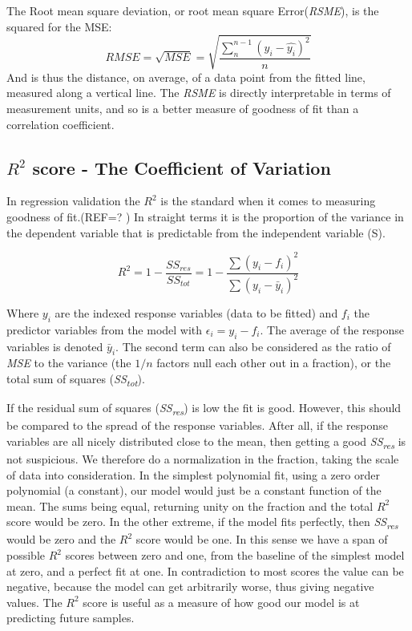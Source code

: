 The Root mean square deviation, or root mean square Error(\textit{RSME}), is the squared for the MSE:
$$RMSE = \sqrt{MSE} =  \sqrt{\frac{\sum^{n-1}_{n}(y_{i}-\hat{y_{i}})^2 }{n}} $$
And is thus the distance, on average, of a data point from the fitted line, measured along a vertical line. The \textit{RSME} is directly interpretable in terms of measurement units, and so is a better measure of goodness of fit than a correlation coefficient. 

\subsection{$R^2$ score - The Coefficient of Variation}

	In regression validation the $R^2$ is the standard when it comes to measuring goodness of fit.(REF=?\cite{coef} ) In straight terms it is the proportion of the variance in the dependent variable that is predictable from the independent variable (S).

\begin{equation}\label{eq: R squared}
	R^2 =1 - \frac{SS_{res}}{SS_{tot}} =  1 - \frac{ \sum(y_i-f_i)^2 }{ \sum(y_i-\bar{y}_i)^2 }
\end{equation}

	Where $y_i$ are the indexed response variables (data  to be fitted) and $f_i$ the predictor variables from the model with $\epsilon_i = y_i - f_i$. The average of the response variables is denoted $\bar{y}_i$. The second term can also be considered as the ratio of \textit{MSE} to the variance (the $1/n$ factors null each other out in a fraction), or the total sum of squares (\textit{SS\textsubscript{tot}}). 
	
	If the residual sum of squares (\textit{SS\textsubscript{res}}) is low the fit is good. However, this should be compared to the spread of the response variables. After all, if the response variables are all nicely distributed close to the mean, then getting a good \textit{SS\textsubscript{res}} is not suspicious. We therefore do a normalization in the fraction, taking the scale of data into consideration. In the simplest polynomial fit, using a zero order polynomial (a constant), our model would just be a constant function of the mean. The sums being equal, returning unity on the fraction and the total $R^2$ score would be zero. In the other extreme, if the model fits perfectly, then \textit{SS\textsubscript{res}} would be zero and the $R^2$ score would be one. In this sense we have a span of possible $R^2$ scores between zero and one, from the baseline of the simplest model at zero, and a perfect fit at one. In contradiction to most scores the value can be negative, because the model can get arbitrarily worse, thus giving negative values.
	The $R^2$ score is useful as a measure of how good our model is at predicting future samples.
	 

